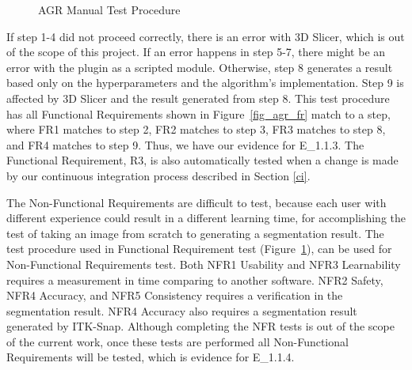 \begin{figure}[H]
\caption[AGR Manual Test Procedure]{AGR Manual Test Procedure}
\label{test_procedure}
\end{figure}

If step 1-4 did not proceed correctly, there is an error with 3D Slicer, which is out of the scope of this project. If an error happens in step 5-7, there might be an error with the plugin as a scripted module. Otherwise, step 8 generates a result based only on the hyperparameters and the algorithm's implementation. Step 9 is affected by 3D Slicer and the result generated from step 8. This test procedure has all Functional Requirements shown in Figure~\ref{fig_agr_fr} match to a step, where FR1 matches to step 2, FR2 matches to step 3, FR3 matches to step 8, and FR4 matches to step 9. Thus, we have our evidence for E\_1.1.3. The Functional Requirement, R3, is also automatically tested when a change is made by our continuous integration process described in Section \ref{ci}.

The Non-Functional Requirements are difficult to test, because each user with different experience could result in a different learning time, for accomplishing the test of taking an image from scratch to generating a segmentation result. The test procedure used in Functional Requirement test (Figure~\ref{test_procedure}), can be used for Non-Functional Requirements test. Both NFR1 Usability and NFR3 Learnability requires a measurement in time comparing to another software. NFR2 Safety, NFR4 Accuracy, and NFR5 Consistency requires a verification in the segmentation result. NFR4 Accuracy also requires a segmentation result generated by ITK-Snap. Although completing the NFR tests is out of the scope of the current work, once these tests are performed all Non-Functional Requirements will be tested, which is evidence for E\_1.1.4.

